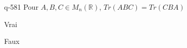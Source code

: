 \begin{truefalse}{q-581}
Pour $A, B, C \in M_n(\mathbb R)$, $Tr(ABC)=Tr(CBA)$
\item Vrai
\item* Faux
\end{truefalse}

